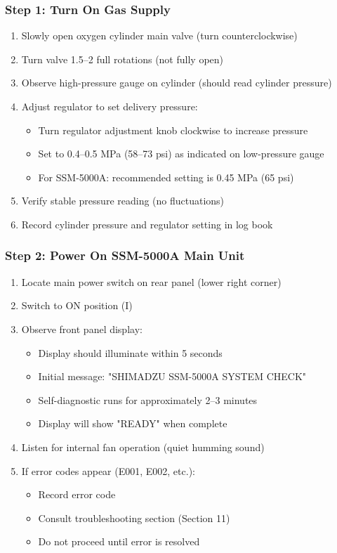 \documentclass[11pt,a4paper]{article}\usepackage[]{graphicx}\usepackage[]{xcolor}
\begin{document}
\subsubsection{Step 1: Turn On Gas Supply}
\begin{enumerate}[noitemsep]
    \item Slowly open oxygen cylinder main valve (turn counterclockwise)
    \item Turn valve 1.5--2 full rotations (not fully open)
    \item Observe high-pressure gauge on cylinder (should read cylinder pressure)
    \item Adjust regulator to set delivery pressure:
    \begin{itemize}
        \item Turn regulator adjustment knob clockwise to increase pressure
        \item Set to 0.4--0.5 MPa (58--73 psi) as indicated on low-pressure gauge
        \item For SSM-5000A: recommended setting is 0.45 MPa (65 psi)
    \end{itemize}
    \item Verify stable pressure reading (no fluctuations)
    \item Record cylinder pressure and regulator setting in log book
\end{enumerate}

\subsubsection{Step 2: Power On SSM-5000A Main Unit}
\begin{enumerate}[noitemsep]
    \item Locate main power switch on rear panel (lower right corner)
    \item Switch to ON position (I)
    \item Observe front panel display:
    \begin{itemize}
        \item Display should illuminate within 5 seconds
        \item Initial message: "SHIMADZU SSM-5000A SYSTEM CHECK"
        \item Self-diagnostic runs for approximately 2--3 minutes
        \item Display will show "READY" when complete
    \end{itemize}
    \item Listen for internal fan operation (quiet humming sound)
    \item If error codes appear (E001, E002, etc.):
    \begin{itemize}
        \item Record error code
        \item Consult troubleshooting section (Section 11)
        \item Do not proceed until error is resolved
    \end{itemize}
\end{enumerate}
\end{document}
